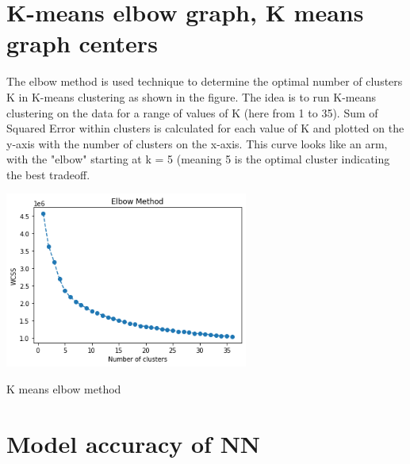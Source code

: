 \documentclass{article}
\begin{document}
\section{K-means elbow graph, K means graph centers}
The elbow method is used technique to determine the optimal number of clusters K in K-means clustering as shown in the figure. The idea is to run K-means clustering on the data for a range of values of K (here from 1 to 35). Sum of Squared Error within clusters is calculated for each value of K and plotted on the y-axis with the number of clusters on the x-axis. This curve looks like an arm, with the "elbow" starting at k = 5 (meaning 5 is the optimal cluster indicating the best tradeoff.
\begin{center}
  \centering
  \includegraphics[width=0.6\textwidth]{k means elbowpng.png} %
\end{center}
\begin{center}
  \footnotesize{K means elbow method}
\end{center}

\section{Model accuracy of NN}
\end{document}
